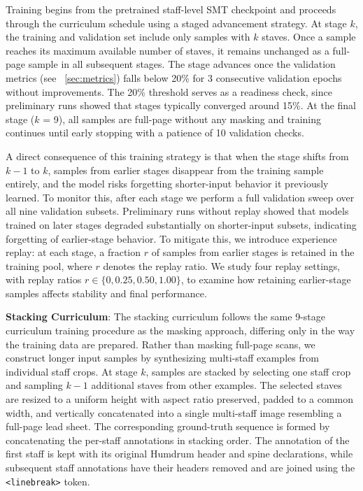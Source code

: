 \documentclass{article}
\begin{document}
Training begins from the pretrained staff-level SMT checkpoint and proceeds through the curriculum schedule using a staged advancement strategy. At stage $k$, the training and validation set include only samples with $k$ staves. Once a sample reaches its maximum available number of staves, it remains unchanged as a full-page sample in all subsequent stages. The stage advances once the validation metrics (see ~\ref{sec:metrics}) falls below 20\% for 3 consecutive validation epochs without improvements. The 20\% threshold serves as a readiness check, since preliminary runs showed that stages typically converged around 15\%. At the final stage ($k$ = 9), all samples are full-page without any masking and training continues until early stopping with a patience of 10 validation checks. 

A direct consequence of this training strategy is that when the stage shifts from $k-1$ to $k$, samples from earlier stages disappear from the training sample entirely, and the model risks forgetting shorter-input behavior it previously learned. To monitor this, after each stage we perform a full validation sweep over all nine validation subsets. Preliminary runs without replay showed that models trained on later stages degraded substantially on shorter-input subsets, indicating forgetting of earlier-stage behavior. To mitigate this, we introduce experience replay: at each stage, a fraction $r$ of samples from earlier stages is retained in the training pool, where $r$ denotes the replay ratio. We study four replay settings, with replay ratios $r \in \{0, 0.25, 0.50, 1.00\}$, to examine how retaining earlier-stage samples affects stability and final performance.


\textbf{Stacking Curriculum}:
The stacking curriculum follows the same 9-stage curriculum training procedure as the masking approach, differing only in the way the training data are prepared. Rather than masking full-page scans, we construct longer input samples by synthesizing multi-staff examples from individual staff crops. At stage $k$, samples are stacked by selecting one staff crop and sampling $k-1$ additional staves from other examples. The selected staves are resized to a uniform height with aspect ratio preserved, padded to a common width, and vertically concatenated into a single multi-staff image resembling a full-page lead sheet. %
The corresponding ground-truth sequence is formed by concatenating the per-staff annotations in stacking order. The annotation of the first staff is kept with its original Humdrum header and spine declarations, while subsequent staff annotations have their headers removed and are joined using the \texttt{<linebreak>} token. 
\end{document}
